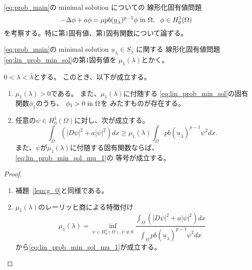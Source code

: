 \ref{eq:prob_main}の minimal solution についての
線形化固有値問題
\begin{equation}
 -\Delta \phi + a \phi = \mu p b (\underline{u}_\lambda)^{p-1} \phi
  ~\text{in}~ \Omega, \ \ \phi \in H_0^1(\Omega) \label{eq:lin_prob_min_sol}
\end{equation}
を考察する。特に第$1$固有値、第$1$固有関数について論ずる。

\begin{nota}
 \ref{eq:prob_main}の
 minimal solution $\underline{u}_\lambda \in S_\lambda$ に関する
 線形化固有値問題\eqref{eq:lin_prob_min_sol}の第$1$固有値を
 $\mu_1(\lambda)$とかく。
\end{nota}

\begin{lem} \label{lem:lin_p}
 $0 < \lambda < \bar{\lambda}$とする。
 このとき、以下が成立する。
 \begin{enumerate}[1.] \sage
  \item $\mu_1(\lambda) > 0$である。
        また、$\mu_1(\lambda)$に付随する
        \eqref{eq:lin_prob_min_sol}の固有関数$\phi_1$のうち、
        $\phi_1 > 0 ~\text{in}~ \Omega$を
        みたすものが存在する。
  \item 任意の$\psi \in H_0^1(\Omega)$に対し、次が成立する。
        \begin{equation}
         \int_\Omega \left( \lvert D\psi \rvert^2 + a \lvert \psi
                      \rvert^2 \right)
          dx \geq \mu_1(\lambda) \int_\Omega pb(\underline{u}_\lambda)^{p-1}
          \psi^2 dx. \label{eq:lin_prob_min_sol_mu_1}
        \end{equation}
        また、$\psi$が$\mu_1(\lambda)$に付随する固有関数ならば、
        \eqref{eq:lin_prob_min_sol_mu_1}の
        等号が成立する。
 \end{enumerate}
\end{lem}

\begin{proof}
 \begin{enumerate}[1.] \sage
  \item 補題~\ref{lem:g_0}と同様である。
  \item $\mu_1(\lambda)$のレーリッヒ商による特徴付け
        \begin{equation}
         \mu_1(\lambda) = \inf_{\psi \in H_0^1(\Omega), \psi \not \equiv 0} 
        \frac{\displaystyle \int_\Omega 
        \left( \left\lvert D\psi \right\rvert^2 + a\lvert\psi\rvert^2 \right)
          dx }{\displaystyle \int_\Omega pb(\underline{u}_\lambda)^{p-1}
          \psi^2 dx } \label{eq:mu1_quotient}        
        \end{equation}
        から\eqref{eq:lin_prob_min_sol_mu_1}が成立する。
 \end{enumerate}
\end{proof}

